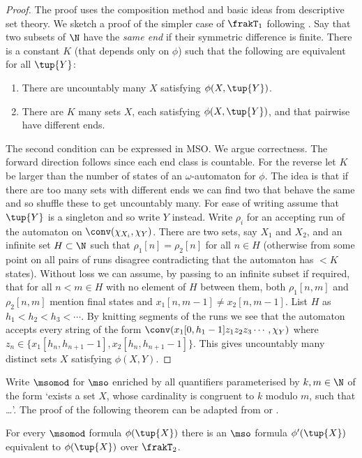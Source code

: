 \begin{proof}
The proof uses the composition method and basic ideas from descriptive set theory. We sketch a proof of the simpler case of $\frakT_1$ following \cite{KuLo05}. Say that two subsets of $\N$
have the {\em same end} if their symmetric difference is finite.  There is a constant $K$ (that depends only on $\phi$) such that the following are equivalent for all $\tup{Y}$:

\begin{enumerate}
\item There are uncountably many $X$ satisfying $\phi(X,\tup{Y})$.
\item There are $K$ many sets $X$, each satisfying $\phi(X,\tup{Y})$, and that pairwise have different ends.
\end{enumerate}
The second condition can be expressed in MSO. We argue correctness.
The forward direction follows since each end class is countable. For the reverse let $K$ be larger than the number of states of an $\omega$-automaton for $\phi$. The idea is that if there are too many sets with different ends we can find two that behave the same and so shuffle these to get uncountably many.  For ease of writing assume that $\tup{Y}$ is a singleton and so write $Y$ instead. Write  $\rho_i$ for an accepting run of the automaton on $\conv(\chi_{X_i},\chi_Y)$. There are two sets, say $X_1$ and $X_2$, and an infinite set $H \subset \N$ such that $\rho_1[n] = \rho_2[n]$ for all $n \in H$ (otherwise from some point on all pairs of runs disagree contradicting that the automaton has $<K$ states). Without loss we can assume, by passing to an infinite subset if required, that for all $n < m \in H$ with no element of $H$ between them, 
both $\rho_1[n,m]$ and $\rho_2[n,m]$ mention final states and $x_1[n,m-1] \neq x_2[n,m-1]$. List $H$ as $h_1 < h_2 < h_3 < \cdots$.
By knitting segments of the runs we see that the automaton accepts every string of the form $\conv(x_1[0,h_1-1]z_1z_2z_3\cdots,\chi_Y)$ where $z_n \in \{x_1[h_n,h_{n+1}-1],x_2[h_n,h_{n+1}-1]\}$.
This gives uncountably many distinct sets $X$ satisfying $\phi(X,Y)$.
\end{proof}

Write $\msomod$ for $\mso$ enriched by all quantifiers parameterised by $k,m \in \N$ of the form `exists a set $X$, whose cardinality is congruent to $k$ modulo $m$, such that \dots'. The proof of the following theorem can be adapted from \cite{KRS04} or \cite{KuLo05}.
\begin{theorem} 
For every $\msomod$ formula $\phi(\tup{X})$ there is an $\mso$ formula
$\phi'(\tup{X})$ equivalent to $\phi(\tup{X})$ over $\frakT_2$.
\end{theorem}

